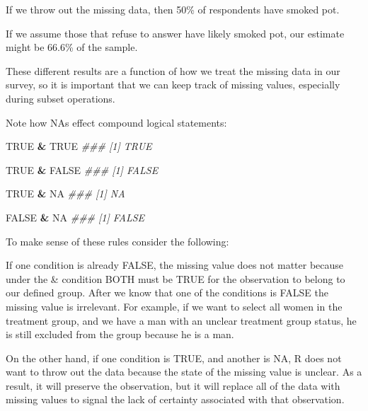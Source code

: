 \documentclass[]{book}
\newenvironment{Shaded}{\begin{snugshade}}{\end{snugshade}}
\newcommand{\CommentTok}[1]{\textcolor[rgb]{0.56,0.35,0.01}{\textit{#1}}}
\newcommand{\OperatorTok}[1]{\textcolor[rgb]{0.81,0.36,0.00}{\textbf{#1}}}
\newcommand{\OtherTok}[1]{\textcolor[rgb]{0.56,0.35,0.01}{#1}}
\newcommand{\StringTok}[1]{\textcolor[rgb]{0.31,0.60,0.02}{#1}}
\theoremstyle{definition}
\theoremstyle{definition}
\theoremstyle{definition}
\theoremstyle{remark}
\begin{document}
If we throw out the missing data, then 50\% of respondents have smoked
pot.

If we assume those that refuse to answer have likely smoked pot, our
estimate might be 66.6\% of the sample.

These different results are a function of how we treat the missing data
in our survey, so it is important that we can keep track of missing
values, especially during subset operations.

Note how NAs effect compound logical statements:

\begin{Shaded}
\begin{Highlighting}[]
\OtherTok{TRUE} \OperatorTok{&}\StringTok{ }\OtherTok{TRUE}
\CommentTok{### [1] TRUE}

\OtherTok{TRUE} \OperatorTok{&}\StringTok{ }\OtherTok{FALSE}
\CommentTok{### [1] FALSE}

\OtherTok{TRUE} \OperatorTok{&}\StringTok{ }\OtherTok{NA}
\CommentTok{### [1] NA}

\OtherTok{FALSE} \OperatorTok{&}\StringTok{ }\OtherTok{NA}
\CommentTok{### [1] FALSE}
\end{Highlighting}
\end{Shaded}

To make sense of these rules consider the following:

If one condition is already FALSE, the missing value does not matter
because under the \& condition BOTH must be TRUE for the observation to
belong to our defined group. After we know that one of the conditions is
FALSE the missing value is irrelevant. For example, if we want to select
all women in the treatment group, and we have a man with an unclear
treatment group status, he is still excluded from the group because he
is a man.

On the other hand, if one condition is TRUE, and another is NA, R does
not want to throw out the data because the state of the missing value is
unclear. As a result, it will preserve the observation, but it will
replace all of the data with missing values to signal the lack of
certainty associated with that observation.
\end{document}
